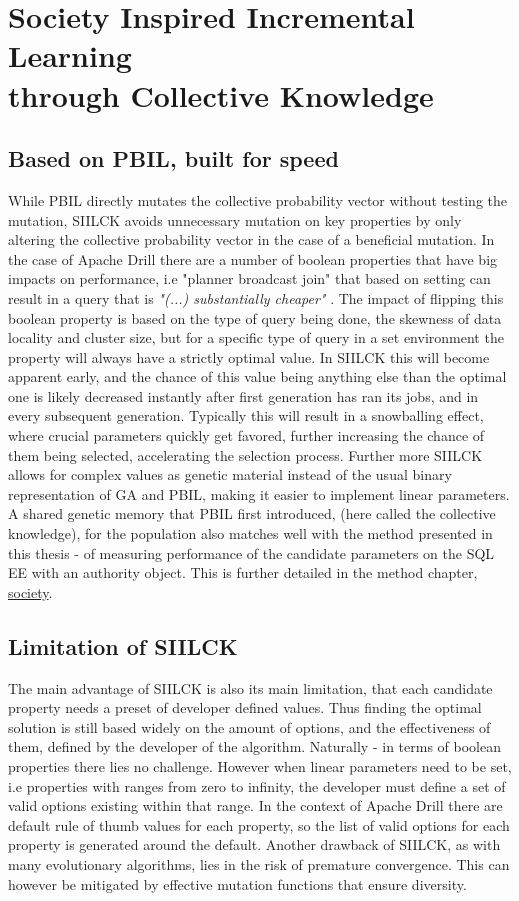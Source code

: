 \documentclass[a4paper,english]{report}
\begin{document}
	\section{Society Inspired Incremental Learning \\through Collective Knowledge}
		\subsection{Based on PBIL, built for speed}
		While PBIL directly mutates the collective probability vector without testing the mutation, SIILCK avoids unnecessary mutation on key properties by only altering the collective probability vector in the case of a beneficial mutation. In the case of Apache Drill there are a number of boolean properties that have big impacts on performance, i.e "planner broadcast join" that based on setting can result in a query that is \textit{"(...) substantially cheaper"} \cite{joinplanning}. The impact of flipping this boolean property is based on the type of query being done, the skewness of data locality and cluster size, but for a specific type of query in a set environment the property will always have a strictly optimal value. In SIILCK this will become apparent early, and the chance of this value being anything else than the optimal one is likely decreased instantly after first generation has ran its jobs, and in every subsequent generation. Typically this will result in a snowballing effect, where crucial parameters quickly get favored, further increasing the chance of them being selected, accelerating the selection process. Further more SIILCK allows for complex values as genetic material instead of the usual binary representation of GA and PBIL, making it easier to implement linear parameters. A shared genetic memory that PBIL first introduced, (here called the collective knowledge), for the population also matches well with the method presented in this thesis - of measuring performance of the candidate parameters on the SQL EE with an authority object. This is further detailed in the method chapter, \hyperref[sec:society]{society}.
		\subsection{Limitation of SIILCK}
		The main advantage of SIILCK is also its main limitation, that each candidate property needs a preset of developer defined values. Thus finding the optimal solution is still based widely on the amount of options, and the effectiveness of them, defined by the developer of the algorithm. Naturally - in terms of boolean properties there lies no challenge. However when linear parameters need to be set, i.e properties with ranges from zero to infinity, the developer must define a set of valid options existing within that range. In the context of Apache Drill there are default rule of thumb values for each property, so the list of valid options for each property is generated around the default. Another drawback of SIILCK, as with many evolutionary algorithms, lies in the risk of premature convergence. This can however be mitigated by effective mutation functions that ensure diversity.
	\pagebreak
\end{document}
